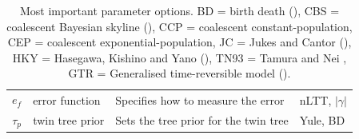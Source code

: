 \documentclass{article}
\begin{document}
\begin{table}
\begin{tabular}{|@{}c|p{2.5cm}|p{9cm}|p{4.5cm}@{}|}
    $\mathit{e_{f}}$ & error function & Specifies how to measure the error 
      & nLTT, $|\gamma|$ \\
    $\mathit{\tau_{p}}$ & twin tree prior 
      & Sets the tree prior for the twin tree 
      & Yule, BD \\
    \hline
  \end{tabular}
  \caption{
    Most important parameter options.
    BD = birth death (\cite{nee1994reconstructed}), 
    CBS = coalescent Bayesian skyline (\cite{drummond2005bayesian}), 
    CCP = coalescent constant-population, 
    CEP = coalescent exponential-population,
    JC = Jukes and Cantor (\cite{jukes1969evolution}), 
    HKY = Hasegawa, Kishino and Yano (\cite{hasegawa1985dating}), 
    TN93 = Tamura and Nei \cite{tamura1993estimation}, 
    GTR = Generalised time-reversible model (\cite{tavare1986some}).
  }
  \label{tab:options}
\bigskip


\end{table}
\end{document}

